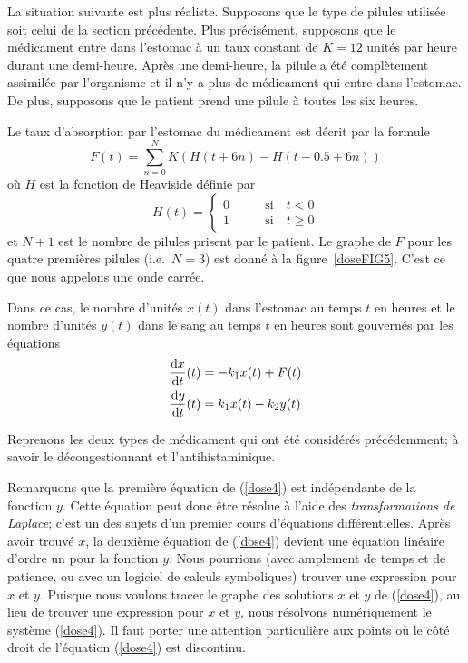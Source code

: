 {\begin{egg}
La situation suivante est plus réaliste.  Supposons que le type de pilules
utilisée soit celui de la section précédente.  Plus précisément,
supposons que le médicament entre dans l'estomac à un taux constant de
$K=12$ unités par heure durant une demi-heure.  Après une demi-heure,
la pilule a été complètement assimilée par l'organisme et il n'y a
plus de médicament qui entre dans l'estomac.  De plus, supposons
que le patient prend une pilule à toutes les six heures.

Le taux d'absorption par l'estomac du médicament est décrit par la formule
\[
F(t) = \sum_{n=0}^N K (H(t + 6 n) - H(t - 0.5 + 6 n))
\]
où $H$ est la fonction de Heaviside définie par
\[
H(t) = \begin{cases}
0 & \qquad \text{si} \quad t<0 \\
1 & \qquad \text{si} \quad t\geq 0
\end{cases}
\]
et $N+1$ est le nombre de pilules prisent par le patient.  Le graphe
de $F$ pour les quatre premières pilules (i.e.\ $N=3$) est donné à la
figure~\ref{doseFIG5}.  C'est ce que nous appelons une onde carrée.


Dans ce cas, le nombre d'unités $x(t)$ dans l'estomac au temps $t$ en heures
et le nombre d'unités $y(t)$ dans le sang au temps $t$ en heures sont
gouvernés par les équations
\begin{equation} \label{dose4}
\begin{split}
\frac{\mathrm{d}x}{\mathrm{d}t}(t) &= -k_1 x(t) + F(t) \\
\frac{\mathrm{d}y}{\mathrm{d}t}(t) &= k_1 x(t) - k_2 y(t)
\end{split}
\end{equation}

Reprenons les deux types de médicament qui ont été considérés
précédemment; à savoir le décongestionnant et l'antihistaminique.

Remarquons que la première équation de (\ref{dose4}) est indépendante de la
fonction $y$.  Cette équation peut donc être résolue à l'aide des
{\em transformations de Laplace}; c'est un des sujets d'un premier
cours d'équations différentielles.  Après avoir trouvé $x$, la
deuxième équation de (\ref{dose4}) devient une équation linéaire
d'ordre un pour la fonction $y$.  Nous pourrions (avec amplement
de temps et de patience, ou avec un logiciel de calculs symboliques)
trouver une expression pour $x$ et $y$. Puisque nous voulons tracer le
graphe des solutions $x$ et $y$ de (\ref{dose4}), au lieu de trouver
une expression pour $x$ et $y$, nous résolvons numériquement le système
(\ref{dose4}).  Il faut porter une attention particulière aux points
où le côté droit de l'équation (\ref{dose4}) est discontinu.


\end{egg}}
